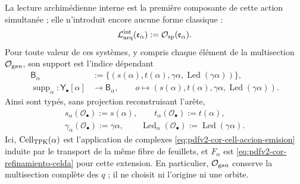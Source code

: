 La lecture archimédienne interne est la première composante de cette action simultanée ; elle n'introduit encore aucune forme classique :
\begin{equation}
\label{pII-full:eq:continuo-lector-arquimediano}
 \mathcal L_{\rm arq}^{\rm int}(\mathfrak e_\alpha)
 :=\mathcal O_{\rm sp}(\mathfrak e_\alpha).
\end{equation}
Pour toute valeur de ces systèmes, y compris chaque élément de la multisection \(\mathcal O_{\rm gau}\), son support est l'indice dépendant
\begin{equation}
\label{eq:pdfv2-cor-soporte-dependiente}
 \begin{aligned}
 \mathsf B_\alpha&:=
 \{(s(\alpha),t(\alpha),\gamma\alpha,
          \operatorname{Led}(\gamma\alpha))\},\\
 \operatorname{supp}_\alpha:\mathsf Y_\bullet[\alpha]&\longrightarrow
 \mathsf B_\alpha,\qquad
 o\longmapsto(s(\alpha),t(\alpha),\gamma\alpha,
          \operatorname{Led}(\gamma\alpha)).
 \end{aligned}
\end{equation}
Ainsi sont typés, sans projection reconstruisant l'arête,
\begin{equation}
\label{eq:pdfv2-cor-soporte-cinco-lecturas}
 \begin{gathered}
 s_\alpha(\mathcal O_\bullet):=s(\alpha),\qquad
 t_\alpha(\mathcal O_\bullet):=t(\alpha),\\
 \gamma_\alpha(\mathcal O_\bullet):=\gamma\alpha,
 \qquad
 \operatorname{Led}_\alpha(\mathcal O_\bullet)
 :=\operatorname{Led}(\gamma\alpha).
 \end{gathered}
\end{equation}
Ici, \(\operatorname{Cell}_{\rm TPK}(\alpha)\) est l'application de complexes \eqref{eq:pdfv2-cor-cell-accion-emision} induite par le transport de la même fibre de feuillets, et \(F_\alpha\) est \eqref{eq:pdfv2-cor-refinamiento-celda} pour cette extension. En particulier, \(\mathcal O_{\rm gau}\) conserve la multisection complète des \(q\) ; il ne choisit ni l'origine ni une orbite.

